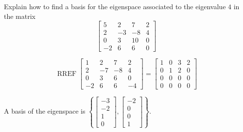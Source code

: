 
\begin{exerciseStatement}


Explain how to find a basis for the eigenspace associated to the eigenvalue \( 4 \) in the matrix \[ \left[\begin{array}{cccc}
5 & 2 & 7 & 2 \\
2 & -3 & -8 & 4 \\
0 & 3 & 10 & 0 \\
-2 & 6 & 6 & 0
\end{array}\right] \]


\end{exerciseStatement}
    
\begin{exerciseAnswer} 


\[\operatorname{RREF} \left[\begin{array}{cccc}
1 & 2 & 7 & 2 \\
2 & -7 & -8 & 4 \\
0 & 3 & 6 & 0 \\
-2 & 6 & 6 & -4
\end{array}\right] = \left[\begin{array}{cccc}
1 & 0 & 3 & 2 \\
0 & 1 & 2 & 0 \\
0 & 0 & 0 & 0 \\
0 & 0 & 0 & 0
\end{array}\right] \]



A basis of the eigenspace is \( \left\{ \left[\begin{array}{c}
-3 \\
-2 \\
1 \\
0
\end{array}\right] , \left[\begin{array}{c}
-2 \\
0 \\
0 \\
1
\end{array}\right] \right\} \).


\end{exerciseAnswer}
    
